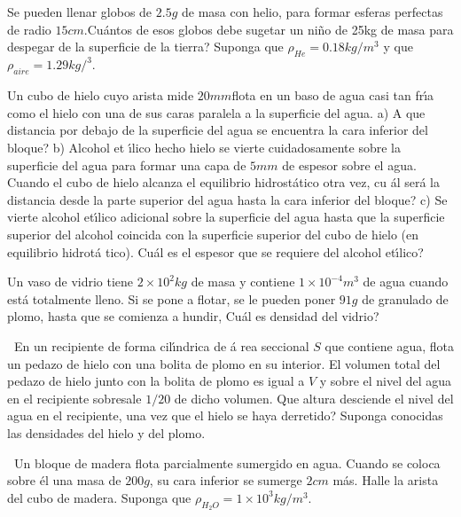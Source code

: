 \documentclass{article}
\begin{document}
 Se pueden llenar globos de $2.5g$ de masa con helio, para
formar esferas perfectas de radio $15cm.$\textquestiondown Cu\'{a}ntos de
esos globos debe sugetar un ni\~{n}o de 25kg de masa para despegar de la
superficie de la tierra? Suponga que $\rho _{He}=0.18kg/m^{3}$ y que $\rho
_{aire}=1.29kg/^{3}.$

\bigskip 

 Un cubo de hielo cuyo arista mide $20mm$flota en un baso de
agua casi tan fr\'{\i}a como el hielo con una de sus caras paralela a la
superficie del agua. a) \textquestiondown A que distancia por debajo de la
superficie del agua se encuentra la cara inferior del bloque? b) Alcohol et%
\'{\i}lico hecho hielo se vierte cuidadosamente sobre la superficie del agua
para formar una capa de $5mm$ de espesor sobre el agua. Cuando el cubo de
hielo alcanza el equilibrio hidrost\'{a}tico otra vez, \textquestiondown cu%
\'{a}l ser\'{a} la distancia desde la parte superior del agua hasta la cara
inferior del bloque? c) Se vierte alcohol et\'{\i}lico adicional sobre la
superficie del agua hasta que la superficie superior del alcohol coincida
con la superficie superior del cubo de hielo (en equilibrio hidrot\'{a}%
tico). \textquestiondown Cu\'{a}l es el espesor que se requiere del alcohol
et\'{\i}lico? 

\bigskip 

 Un vaso de vidrio tiene $2\times 10^{2}kg$ de masa y
contiene $1\times 10^{-4}m^{3}$ de agua cuando est\'{a} totalmente lleno. Si
se pone a flotar, se le pueden poner $91g$ de granulado de plomo, hasta que
se comienza a hundir, \textquestiondown Cu\'{a}l es densidad del vidrio?

\bigskip 

\textbf{\ }En un recipiente de forma cil\'{\i}ndrica de \'{a}%
rea seccional $S$ que contiene agua, flota un pedazo de hielo con una bolita
de plomo en su interior. El volumen total del pedazo de hielo junto con la
bolita de plomo es igual a $V$ y sobre el nivel del agua en el recipiente
sobresale $1/20$ de dicho volumen. Que altura desciende el nivel del agua en
el recipiente, una vez que el hielo se haya derretido? Suponga conocidas las
densidades del hielo y del plomo.

\bigskip 

\textbf{\ }Un bloque de madera flota parcialmente sumergido
en agua. Cuando se coloca sobre \'{e}l una masa de $200g$, su cara inferior
se sumerge $2cm$ m\'{a}s. Halle la arista del cubo de madera. Suponga que $%
\rho _{H_{2}O}=1\times 10^{3}kg/m^{3}.$
\end{document}
